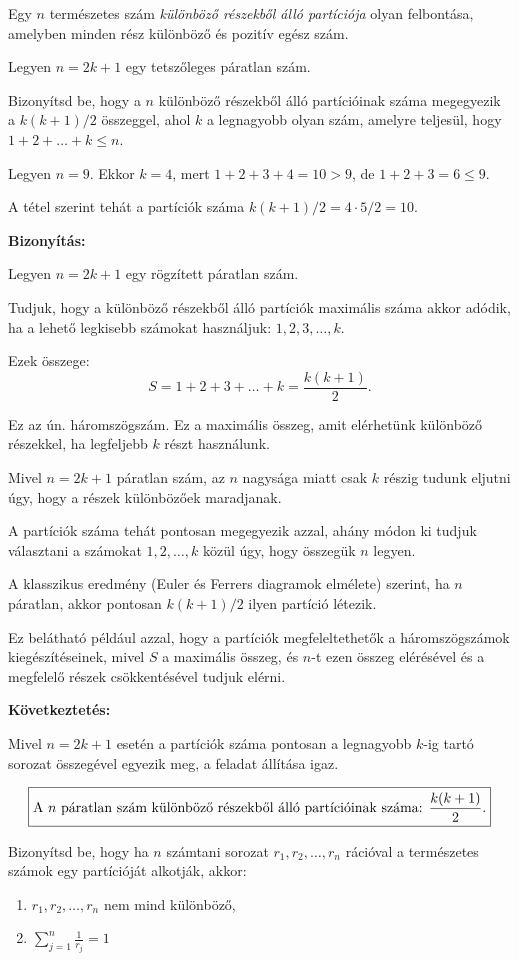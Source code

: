 \begin{extraproblem}
Egy $n$ természetes szám \emph{különböző részekből álló partíciója}
olyan felbontása, amelyben minden rész különböző és pozitív egész
szám.

Legyen $n=2k+1$ egy tetszőleges páratlan szám.

Bizonyítsd be, hogy a $n$ különböző részekből álló partícióinak száma
megegyezik a $k(k+1)/2$ összeggel, ahol $k$ a legnagyobb olyan szám,
amelyre teljesül, hogy $1+2+\dots+k\leq n$.
\end{extraproblem}
\begin{solution}
Legyen $n=9$. Ekkor $k=4$, mert $1+2+3+4=10>9$, de $1+2+3=6\leq9$.

A tétel szerint tehát a partíciók száma $k(k+1)/2=4\cdot5/2=10$.

\vspace{0.5cm}

\textbf{Bizonyítás:}

Legyen $n=2k+1$ egy rögzített páratlan szám.

Tudjuk, hogy a különböző részekből álló partíciók maximális száma
akkor adódik, ha a lehető legkisebb számokat használjuk: $1,2,3,\dots,k$.

Ezek összege: 
\[
S=1+2+3+\dots+k=\frac{k(k+1)}{2}.
\]

Ez az ún. háromszögszám. Ez a maximális összeg, amit elérhetünk különböző
részekkel, ha legfeljebb $k$ részt használunk.

Mivel $n=2k+1$ páratlan szám, az $n$ nagysága miatt csak $k$ részig
tudunk eljutni úgy, hogy a részek különbözőek maradjanak.

A partíciók száma tehát pontosan megegyezik azzal, ahány módon ki
tudjuk választani a számokat $1,2,\dots,k$ közül úgy, hogy összegük
$n$ legyen.

A klasszikus eredmény (Euler és Ferrers diagramok elmélete) szerint,
ha $n$ páratlan, akkor pontosan $k(k+1)/2$ ilyen partíció létezik.

Ez belátható például azzal, hogy a partíciók megfeleltethetők a háromszögszámok
kiegészítéseinek, mivel $S$ a maximális összeg, és $n$-t ezen összeg
elérésével és a megfelelő részek csökkentésével tudjuk elérni.

\textbf{Következtetés:}

Mivel $n=2k+1$ esetén a partíciók száma pontosan a legnagyobb $k$-ig
tartó sorozat összegével egyezik meg, a feladat állítása igaz.

\[
\boxed{\text{A \ensuremath{n} páratlan szám különböző részekből álló partícióinak száma: }\frac{k(k+1)}{2}.}
\]
\end{solution}
\begin{extraproblem}
Bizonyítsd be, hogy ha $n$ számtani sorozat $r_{1},r_{2},\dots,r_{n}$
rációval a természetes számok egy partícióját alkotják, akkor:
\begin{enumerate}
\item $r_{1},r_{2},\dots,r_{n}$ nem mind különböző, 
\item ${\displaystyle \sum_{j=1}^{n}\frac{1}{r_{j}}=1}$ 
\end{enumerate}
\end{extraproblem}
\bigskip{}

